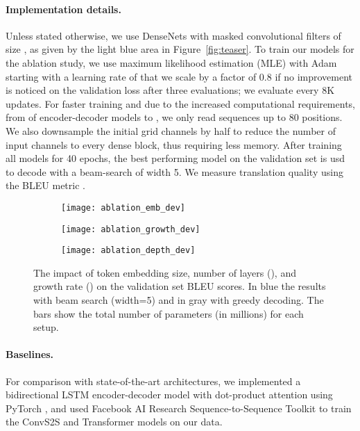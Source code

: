 \documentclass[11pt,a4paper]{article}
\def\fig#1{Figure~\ref{fig:#1}}
\begin{document}
\paragraph{Implementation details.}
Unless stated otherwise, we use DenseNets with masked convolutional filters of size , as given by the light blue area in \fig{teaser}.
To train our models for the ablation study, we use maximum likelihood estimation (MLE) with Adam  starting with a learning rate of  that we scale by a factor of 0.8 if no improvement is noticed on the validation loss after three evaluations; we evaluate every 8K updates.
For faster training and due to the increased computational requirements, from  of encoder-decoder models to , we only read sequences up to 80 positions. We also downsample the initial grid channels by half to reduce the number of input channels to every dense block, thus requiring less memory.
After training all models for 40 epochs, the best performing model on the validation set is usd to decode with a beam-search of width 5. We measure translation quality using the BLEU metric \cite{papineni02acl}.
\begin{figure*}[!t]
\begin{center}
\begin{subfigure}{0.32\textwidth}
    \caption{\label{fig:ablation:emb} } 
\texttt{[image: ablation\_emb\_dev]}
\end{subfigure}
\begin{subfigure}{0.32\textwidth}
    \caption{\label{fig:ablation:growth}}
\texttt{[image: ablation\_growth\_dev]}
\end{subfigure}
\begin{subfigure}{0.32\textwidth}
\caption{\label{fig:ablation:depth} } 
\texttt{[image: ablation\_depth\_dev]} 
\end{subfigure}
\end{center}
\caption{The impact of token embedding size, number of layers (), and growth rate () on the validation set BLEU scores. 
    In blue the results with beam search (width=5) and in gray with greedy decoding. The bars show the total number of parameters (in millions) for each setup.
}
\label{fig:ablation}
\end{figure*}


\paragraph{Baselines.}
For comparison with state-of-the-art architectures, we implemented a bidirectional LSTM encoder-decoder model with dot-product attention \cite{bahdanau15iclr, luong15emnlp} using PyTorch \cite{paszke17nipsw}, and used Facebook AI Research Sequence-to-Sequence Toolkit \cite{gehring17icml} to train the ConvS2S and  Transformer \cite{vaswani17nips} models on our data.
\end{document}
